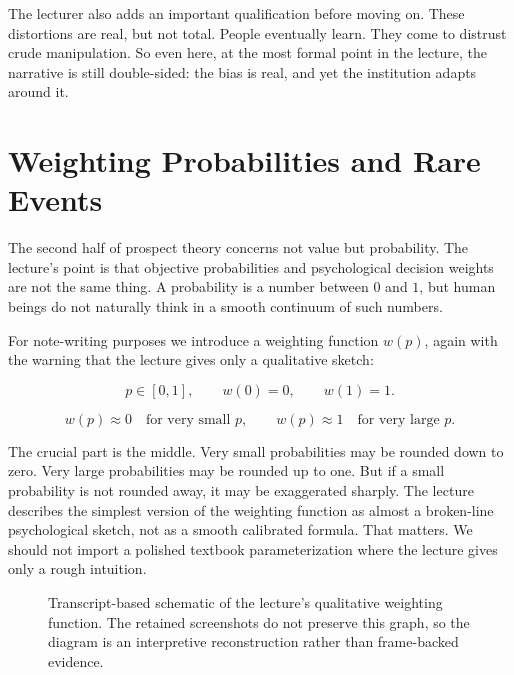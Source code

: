 The lecturer also adds an important qualification before moving on. These distortions are real, but not total. People eventually learn. They come to distrust crude manipulation. So even here, at the most formal point in the lecture, the narrative is still double-sided: the bias is real, and yet the institution adapts around it.

\section{Weighting Probabilities and Rare Events}

The second half of prospect theory concerns not value but probability. The lecture's point is that objective probabilities and psychological decision weights are not the same thing. A probability is a number between \(0\) and \(1\), but human beings do not naturally think in a smooth continuum of such numbers.

For note-writing purposes we introduce a weighting function \(w(p)\), again with the warning that the lecture gives only a qualitative sketch:

\begin{equation}
p\in[0,1], \qquad w(0)=0, \qquad w(1)=1.
\end{equation}

\begin{equation}
w(p)\approx 0 \quad \text{for very small } p,
\qquad
w(p)\approx 1 \quad \text{for very large } p.
\end{equation}

The crucial part is the middle. Very small probabilities may be rounded down to zero. Very large probabilities may be rounded up to one. But if a small probability is not rounded away, it may be exaggerated sharply. The lecture describes the simplest version of the weighting function as almost a broken-line psychological sketch, not as a smooth calibrated formula. That matters. We should not import a polished textbook parameterization where the lecture gives only a rough intuition.

\begin{figure}[h]
\centering
{}
\caption{Transcript-based schematic of the lecture's qualitative weighting function. The retained screenshots do not preserve this graph, so the diagram is an interpretive reconstruction rather than frame-backed evidence.}
\end{figure}

